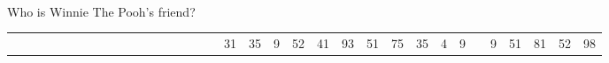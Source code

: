 \documentclass[20pt]{extarticle}
\begin{document}
\\
\\
\\
Who is Winnie The Pooh's friend?
\\

  \begin{tabular}{ccccccccccc p{2em} ccccc}
  \underline{\hspace{1em}}&\underline{\hspace{1em}}&\underline{\hspace{1em}}&\underline{\hspace{1em}}&\underline{\hspace{1em}}&\underline{\hspace{1em}}&\underline{\hspace{1em}}&\underline{\hspace{1em}}&\underline{\hspace{1em}}&\underline{\hspace{1em}}&\underline{\hspace{1em}}&&\underline{\hspace{1em}}&\underline{\hspace{1em}}&\underline{\hspace{1em}}&\underline{\hspace{1em}}&\underline{\hspace{1em}}&
  31&35&9&52&41&93&51&75&35&4&9& &9&51&81&52&98&
\end{tabular}

\\
\end{document}
